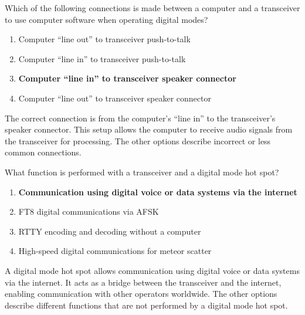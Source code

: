 
\begin{tcolorbox}[colback=gray!10!white,colframe=black!75!black,title={T4A07}]
    Which of the following connections is made between a computer and a transceiver to use computer software when operating digital modes?
    \begin{enumerate}[label=\Alph*),noitemsep]
        \item Computer “line out” to transceiver push-to-talk
        \item Computer “line in” to transceiver push-to-talk
        \item \textbf{Computer “line in” to transceiver speaker connector}
        \item Computer “line out” to transceiver speaker connector
    \end{enumerate}
\end{tcolorbox}
The correct connection is from the computer's “line in” to the transceiver's speaker connector. This setup allows the computer to receive audio signals from the transceiver for processing. The other options describe incorrect or less common connections.


\begin{tcolorbox}[colback=gray!10!white,colframe=black!75!black,title={T4A10}]
    What function is performed with a transceiver and a digital mode hot spot?
    \begin{enumerate}[label=\Alph*),noitemsep]
        \item \textbf{Communication using digital voice or data systems via the internet}
        \item FT8 digital communications via AFSK
        \item RTTY encoding and decoding without a computer
        \item High-speed digital communications for meteor scatter
    \end{enumerate}
\end{tcolorbox}
A digital mode hot spot allows communication using digital voice or data systems via the internet. It acts as a bridge between the transceiver and the internet, enabling communication with other operators worldwide. The other options describe different functions that are not performed by a digital mode hot spot.


